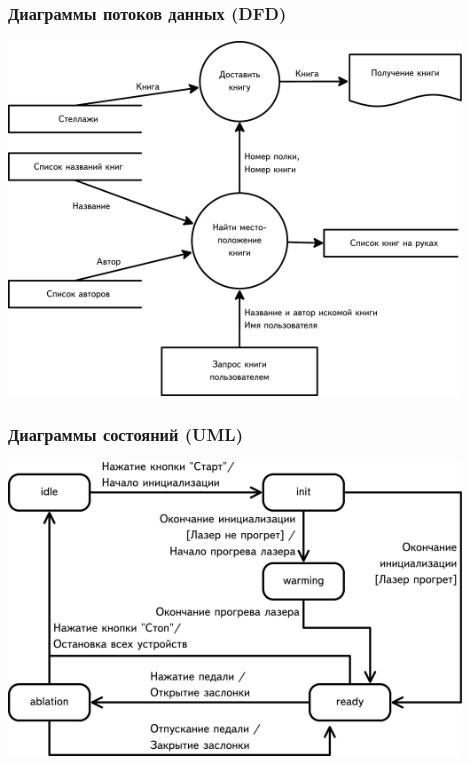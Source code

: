\documentclass{softengineering-lectures}
\begin{document}
\begin{frame} \frametitle{Диаграммы потоков данных (DFD)}

  \centerline{\includegraphics[width=0.9\textwidth]{dfd.pdf}}

\end{frame}

\begin{frame} \frametitle{Диаграммы состояний (UML)}

  \centerline{\includegraphics[width=0.9\textwidth]{states1.pdf}}

\end{frame}
\end{document}
